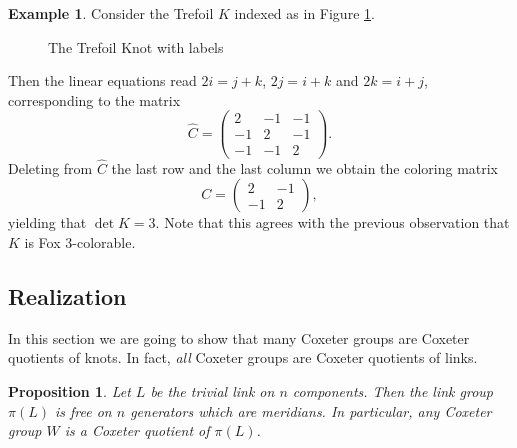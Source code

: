 \documentclass{article}
\newtheorem{proposition}[theorem]{Proposition}
\theoremstyle{definition}
\newtheorem{example}[theorem]{Example}
\begin{document}
\begin{example}
Consider the Trefoil $K$ indexed as in Figure \ref{fig:trefoil-labeled-for-coloring}.
\begin{figure}[ht]
\centering
{}
\caption{The Trefoil Knot with labels}
\label{fig:trefoil-labeled-for-coloring}
\end{figure}

Then the linear equations read $2i = j + k$, $2j = i + k$ and $2k = i + j$, corresponding to the matrix
$$\widehat{C} = \left(\begin{matrix}
2 & -1 & -1 \\
-1 & 2 & -1 \\
-1 & -1 & 2
\end{matrix}\right).$$
Deleting from $\widehat{C}$ the last row and the last column we obtain the coloring matrix
$$C = \left( \begin{matrix}
2 & -1 \\
-1 & 2
\end{matrix} \right),$$
yielding that $\det K = 3$. Note that this agrees with the previous observation that $K$ is Fox $3$-colorable.
\end{example}

\subsection{Realization}
In this section we are going to show that many Coxeter groups are Coxeter quotients of knots. In fact, \textit{all} Coxeter groups are Coxeter quotients of links.

\begin{proposition}\label{prop:trivial-realization}
Let $L$ be the trivial link on $n$ components. Then the link group $\pi(L)$ is free on $n$ generators which are meridians. In particular, any Coxeter group $W$ is a Coxeter quotient of $\pi(L)$.
\end{proposition}
\end{document}
